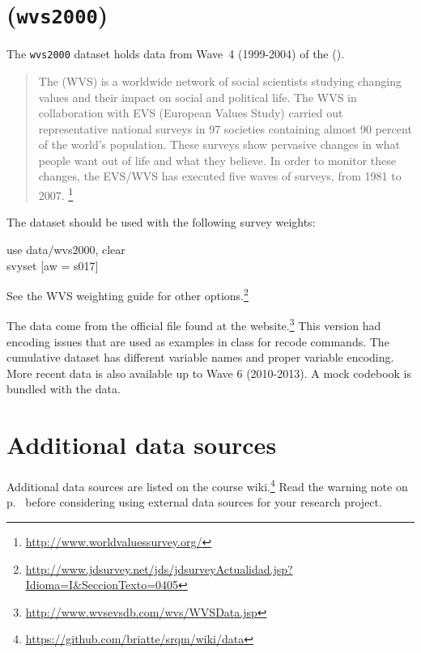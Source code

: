 \section*{\wvs (\texttt{wvs2000})}

The \texttt{wvs2000} dataset holds data from Wave~4 (1999-2004) of the \wvs (\WVS).

\begin{quote}
	The \wvs (WVS) is a worldwide network of social scientists studying changing values and their impact on social and political life. The WVS in collaboration with EVS (European Values Study) carried out representative national surveys in 97 societies containing almost 90 percent of the world's population. These surveys show pervasive changes in what people want out of life and what they believe. In order to monitor these changes, the EVS/WVS has executed five waves of surveys, from 1981 to 2007.%
	\footnote{\url{http://www.worldvaluessurvey.org/}}
\end{quote}

The \WVS dataset should be used with the following survey weights:

\begin{docspec}
	use data/wvs2000, clear\\
	svyset [aw = s017]
\end{docspec}

See the WVS weighting guide for other options.\footnote{\url{http://www.jdsurvey.net/jds/jdsurveyActualidad.jsp?Idioma=I&SeccionTexto=0405}}

The data come from the  official file found at the \WVS website.\footnote{\url{http://www.wvsevsdb.com/wvs/WVSData.jsp}} This version had encoding issues that are used as examples in class for recode commands. The cumulative dataset has different variable names and proper variable encoding. More recent data is also available up to Wave 6 (2010-2013). A mock codebook is bundled with the data.

\section*{Additional data sources}

Additional data sources are listed on the course wiki.\footnote{\url{https://github.com/briatte/srqm/wiki/data}} Read the warning note on p.~\pageref{external-data-warning} before considering using external data sources for your research project.

